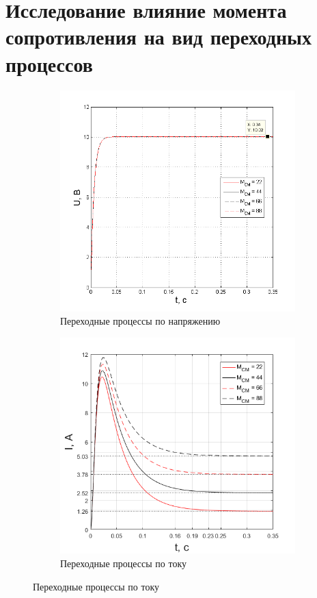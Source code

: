 \documentclass[fleqn, a4paper, 11pt, russian]{article}
\begin{document}
	\section{Исследование влияние момента сопротивления на вид переходных процессов}
	\begin{figure}[ht!]
		\centering
		\begin{subfigure}[b]{0.49\textwidth}
			\includegraphics[width = \textwidth]{Mvar/MvarU}
			\caption{Переходные процессы по напряжению}
		\end{subfigure}
		\hfill
		\begin{subfigure}[b]{0.49\textwidth}
			\includegraphics[width = \textwidth]{Mvar/MvarI}
			\caption{Переходные процессы по току}
		\end{subfigure}
	\end{figure}
\end{document}
